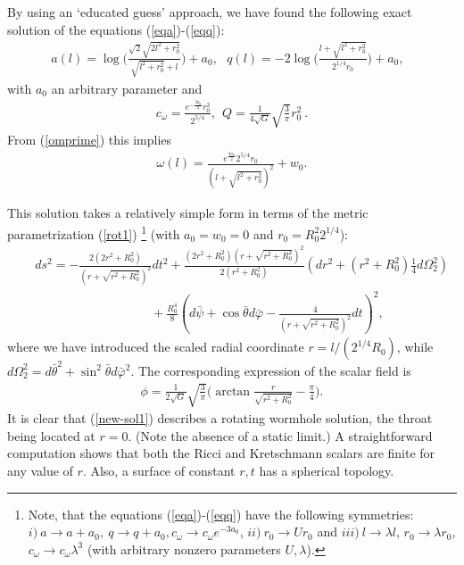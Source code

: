 \documentclass[showpacs,preprintnumbers,amsmath,amssymb,floatfix]{revtex4}
\begin{document}
\begin{appendix}
By using an `educated guess' approach,  we have found the following exact solution of the
  equations (\ref{eqa})-(\ref{eqq}):
\begin{eqnarray}
a(l)=\log \big( \frac{\sqrt{2}\sqrt{2l^2+r_0^2}}{\sqrt{ l^2+r_0^2}+l} \big)+a_0,~~~
q(l)=-2\log \big(\frac{l+\sqrt{ l^2+r_0^2}}{2^{1/4}r_0}\big)+a_0,~~~
\end{eqnarray}
with $a_0$ an arbitrary parameter and 
\begin{eqnarray}
c_\omega=\frac{e^{-\frac{3a_0}{2}}r_0^3}{2^{5/4}},~~Q=\frac{1}{4\sqrt{G}}\sqrt{\frac{3}{\pi}}r_0^2~.
\end{eqnarray}
{From} (\ref{omprime}) this implies
\begin{eqnarray}
\omega(l)=\frac{e^{\frac{3a_0}{2}}2^{5/4}r_0}{(l+\sqrt{ l^2+r_0^2})^2}+w_0.
\end{eqnarray}

This solution takes
a relatively simple form 
in terms of the metric parametrization (\ref{rot1})
\footnote{Note, that the equations (\ref{eqa})-(\ref{eqq})
have the following symmetries: 
$
i)~a\to a+a_0,~q\to q+a_0,
c_\omega \to c_\omega e^{-3 a_0}
$,
$ii)~r_0 \to  U r_0$
and
$iii)~l\to \lambda l$, 
$r_0 \to  \lambda r_0$,
$c_\omega \to c_\omega \lambda^3$
(with arbitrary nonzero parameters $U,\lambda$).
} 
(with  $a_0=w_0=0$ and $r_0=R_0^2 2^{1/4}$):
\begin{eqnarray}
\label{new-sol1}
&&
ds^2=-\frac{2(2r^2+R_0^2)}{(r+\sqrt{r^2+R_0^2})^2}dt^2
+\frac{(2r^2+R_0^2)(r+\sqrt{r^2+R_0^2})^2}{2(r^2+R_0^2)}
\left (dr^2+(r^2+R_0^2)\frac{1}{4}d\Omega_2^2 \right)
\\
\nonumber
&&
{~~~~~~~~~~~~~~~~~~~~~~~~~~~~~~~~~~~~~~~~~~}
+\frac{R_0^4}{8}
\left(
d\bar \psi+\cos \bar \theta d\bar \varphi-\frac{4}{(r+\sqrt{r^2+R_0^2})^2}dt
\right)^2,
\end{eqnarray} 
where we have introduced the scaled radial coordinate
  $r=l/(2^{1/4} R_0)$, 
  while
$d\Omega_2^2= d\bar \theta^2+\sin^2\bar \theta d \bar \varphi^2$.
The corresponding expression of the scalar field is
\begin{eqnarray}
\label{new-sol-scalar}
\phi=\frac{1}{2\sqrt{G}}\sqrt{\frac{3}{\pi}}
\bigg(
\arctan\frac{r}{\sqrt{r^2+R_0^2}}
-\frac{\pi}{4}
\bigg).
\end{eqnarray} 
It is clear that (\ref{new-sol1}) 
describes a rotating wormhole solution, the throat being located at $r=0$.
(Note the absence of a static limit.) 
A straightforward computation shows that both the Ricci and Kretschmann
scalars are finite for any value of $r$.
Also, a surface of constant $r,t$ has a spherical topology.



\end{appendix}
\end{document}
